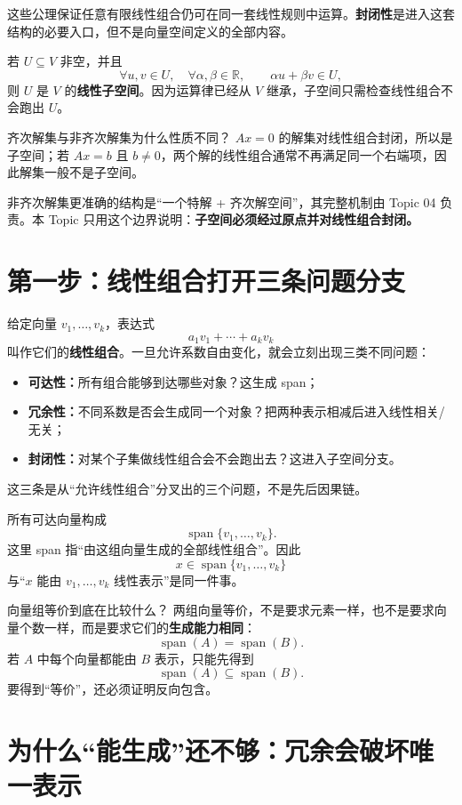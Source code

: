 \documentclass[11pt,a4paper]{ctexart}
\newcommand{\kw}[1]{\textbf{\color{deep}#1}}
\begin{document}
这些公理保证任意有限线性组合仍可在同一套线性规则中运算。\kw{封闭性}是进入这套结构的必要入口，但不是向量空间定义的全部内容。

若 $U\subseteq V$ 非空，并且
\[
\forall u,v\in U,\quad \forall\alpha,\beta\in\mathbb R,
\qquad \alpha u+\beta v\in U,
\]
则 $U$ 是 $V$ 的\kw{线性子空间}。因为运算律已经从 $V$ 继承，子空间只需检查线性组合不会跑出 $U$。

\begin{warnbox}{齐次解集与非齐次解集为什么性质不同？}
$Ax=0$ 的解集对线性组合封闭，所以是子空间；若 $Ax=b$ 且 $b\neq0$，两个解的线性组合通常不再满足同一个右端项，因此解集一般不是子空间。

非齐次解集更准确的结构是“一个特解 + 齐次解空间”，其完整机制由 Topic 04 负责。本 Topic 只用这个边界说明：\kw{子空间必须经过原点并对线性组合封闭。}
\end{warnbox}

\section{第一步：线性组合打开三条问题分支}

给定向量 $v_1,\dots,v_k$，表达式
\[
a_1v_1+\cdots+a_kv_k
\]
叫作它们的\kw{线性组合}。一旦允许系数自由变化，就会立刻出现三类不同问题：
\begin{itemize}
  \item \kw{可达性：}所有组合能够到达哪些对象？这生成 span；
  \item \kw{冗余性：}不同系数是否会生成同一个对象？把两种表示相减后进入线性相关/无关；
  \item \kw{封闭性：}对某个子集做线性组合会不会跑出去？这进入子空间分支。
\end{itemize}
这三条是从“允许线性组合”分叉出的三个问题，不是先后因果链。

所有可达向量构成
\[
\operatorname{span}\{v_1,\dots,v_k\}.
\]
这里 span 指“由这组向量生成的全部线性组合”。因此
\[
x\in\operatorname{span}\{v_1,\dots,v_k\}
\]
与“$x$ 能由 $v_1,\dots,v_k$ 线性表示”是同一件事。

\begin{methodbox}{向量组等价到底在比较什么？}
两组向量等价，不是要求元素一样，也不是要求向量个数一样，而是要求它们的\kw{生成能力相同}：
\[
\operatorname{span}(A)=\operatorname{span}(B).
\]
若 $A$ 中每个向量都能由 $B$ 表示，只能先得到
\[
\operatorname{span}(A)\subseteq\operatorname{span}(B).
\]
要得到“等价”，还必须证明反向包含。
\end{methodbox}

\section{为什么“能生成”还不够：冗余会破坏唯一表示}
\end{document}
